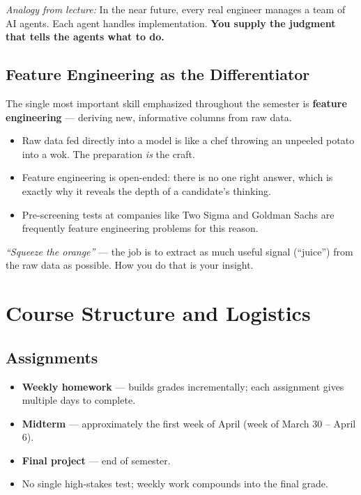 \documentclass[11pt]{article}
\begin{document}
\textit{Analogy from lecture:} In the near future, every real engineer manages a team of AI agents. Each agent handles implementation. \textbf{You supply the judgment that tells the agents what to do.}

\subsection{Feature Engineering as the Differentiator}
The single most important skill emphasized throughout the semester is \textbf{feature engineering} --- deriving new, informative columns from raw data.

\begin{itemize}
    \item Raw data fed directly into a model is like a chef throwing an unpeeled potato into a wok. The preparation \emph{is} the craft.
    \item Feature engineering is open-ended: there is no one right answer, which is exactly why it reveals the depth of a candidate's thinking.
    \item Pre-screening tests at companies like Two Sigma and Goldman Sachs are frequently feature engineering problems for this reason.
\end{itemize}

\textit{``Squeeze the orange''} --- the job is to extract as much useful signal (``juice'') from the raw data as possible. How you do that is your insight.

\newpage
\section{Course Structure and Logistics}

\subsection{Assignments}
\begin{itemize}
    \item \textbf{Weekly homework} --- builds grades incrementally; each assignment gives multiple days to complete.
    \item \textbf{Midterm} --- approximately the first week of April (week of March 30 -- April 6).
    \item \textbf{Final project} --- end of semester.
    \item No single high-stakes test; weekly work compounds into the final grade.
\end{itemize}
\end{document}
